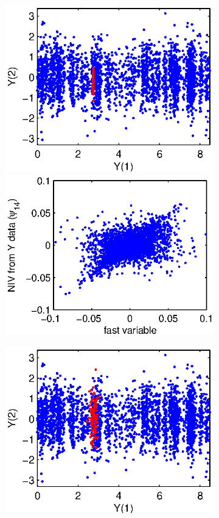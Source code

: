 \documentclass[1p]{elsarticle}
\begin{document}
\begin{figure}[h]
\begin{subfigure}{0.3\textwidth}
\includegraphics[width=\textwidth]{data_withburst_2}
\includegraphics[width=\textwidth]{fast_var_corr_2}
\caption{}
\end{subfigure}
\begin{subfigure}{0.3\textwidth}
\includegraphics[width=\textwidth]{data_withburst_3}

\end{subfigure}
\end{figure}
\end{document}
